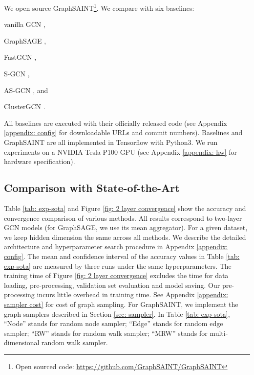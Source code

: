 \documentclass{article} \usepackage{iclr2020_conference,times}
\newcommand{\graphsaint}{{\fontfamily{lmtt}\selectfont GraphSAINT}}
\begin{document}
We open source {\graphsaint}\footnote{Open sourced code: \url{https://github.com/GraphSAINT/GraphSAINT}}.
We compare with six baselines: 
\begin{enumerate*}
\item vanilla GCN \citep{gcn},
\item GraphSAGE \citep{graphsage},
\item FastGCN \citep{fastgcn},
\item S-GCN \citep{s-gcn},
\item AS-GCN \citep{as-gcn}, and
\item ClusterGCN \citep{cluster-gcn}.
\end{enumerate*}
All baselines are executed with their officially released code (see Appendix \ref{appendix: config} for downloadable URLs and commit numbers).
Baselines and {\graphsaint} are all implemented in Tensorflow with Python3. 
We run experiments on a NVIDIA Tesla P100 GPU (see Appendix \ref{appendix: hw} for hardware specification). 



\subsection{Comparison with State-of-the-Art}
\label{sec: sota}

Table \ref{tab: exp-sota} and Figure \ref{fig: 2 layer convergence} show the accuracy and convergence comparison of various methods. 
All results correspond to two-layer GCN models (for GraphSAGE, we use its mean aggregator). For a given dataset, we keep hidden dimension the same across all methods. We describe the detailed architecture and hyperparameter search procedure in Appendix \ref{appendix: config}. The mean and confidence interval of the accuracy values in Table \ref{tab: exp-sota} are measured by three runs under the same hyperparameters. 
The training time of Figure \ref{fig: 2 layer convergence} excludes the time for data loading, pre-processing, validation set evaluation and model saving. 
Our pre-processing incurs little overhead in training time. See Appendix \ref{appendix: sampler cost} for cost of graph sampling. 
For {\graphsaint}, we implement the graph samplers described in Section \ref{sec: sampler}. In Table \ref{tab: exp-sota}, ``Node'' stands for random node sampler; ``Edge'' stands for random edge sampler; ``RW'' stands for random walk sampler; ``MRW'' stands for multi-dimensional random walk sampler. 
\end{document}
